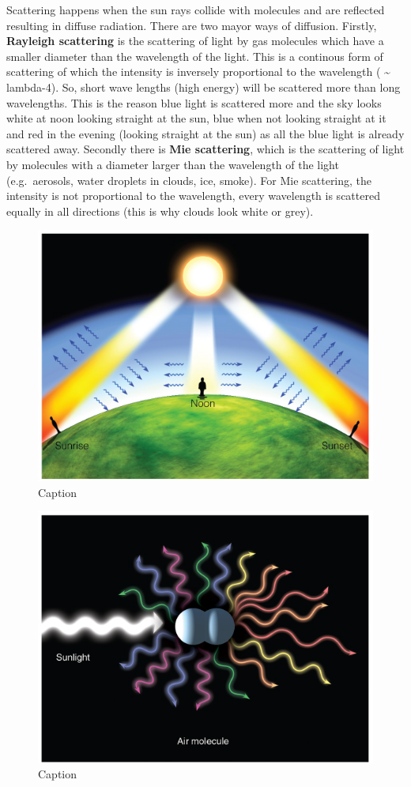 \documentclass[oneside]{book}
\begin{document}
Scattering happens when the sun rays collide with molecules and are
reflected resulting in diffuse radiation. There are two mayor ways of
diffusion. Firstly, \textbf{Rayleigh scattering} is the scattering of
light by gas molecules which have a smaller diameter than the wavelength
of the light. This is a continous form of scattering of which the
intensity is inversely proportional to the wavelength (
\textasciitilde{} lambda-4). So, short wave lengths (high energy) will
be scattered more than long wavelengths. This is the reason blue light
is scattered more and the sky looks white at noon looking straight at
the sun, blue when not looking straight at it and red in the evening
(looking straight at the sun) as all the blue light is already scattered
away. Secondly there is \textbf{Mie scattering}, which is the scattering
of light by molecules with a diameter larger than the wavelength of the
light (e.g.~aerosols, water droplets in clouds, ice, smoke). For Mie
scattering, the intensity is not proportional to the wavelength, every
wavelength is scattered equally in all directions (this is why clouds
look white or grey).

\begin{figure}

{\centering \includegraphics[width=0.5\linewidth]{figures/Figure124} 

}

\caption{Caption}\label{fig:Scattering}
\end{figure}

\begin{figure}

{\centering \includegraphics[width=0.5\linewidth]{figures/Figure125} 

}

\caption{Caption}\label{fig:Scattering2}
\end{figure}
\end{document}
